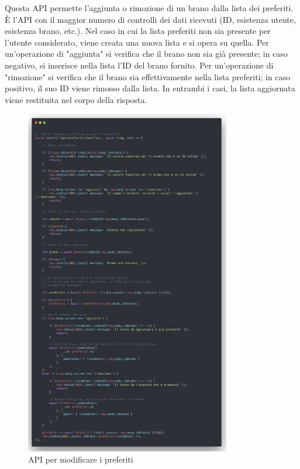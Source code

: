 \documentclass[a4paper,12pt]{article}
\begin{document}
Questa API permette l'aggiunta o rimozione di un brano dalla lista dei preferiti. È l'API con il maggior numero di controlli dei dati ricevuti (ID, esistenza utente, esistenza brano, etc.). Nel caso in cui la lista preferiti non sia presente per l'utente considerato, viene creata una nuova lista e si opera su quella. Per un'operazione di "aggiunta" si verifica che il brano non sia già presente; in caso negativo, si inserisce nella lista l'ID del brano fornito. Per un'operazione di "rimozione" si verifica che il brano sia effettivamente nella lista preferiti; in caso positivo, il suo ID viene rimosso dalla lista. In entrambi i casi, la lista aggiornata viene restituita nel corpo della risposta.

\begin{figure}[htp]
    \centering
    \includegraphics[width=0.8\textwidth]{source-code/api-modifica-preferiti.png}
    \caption{API per modificare i preferiti}
\end{figure}
\end{document}
